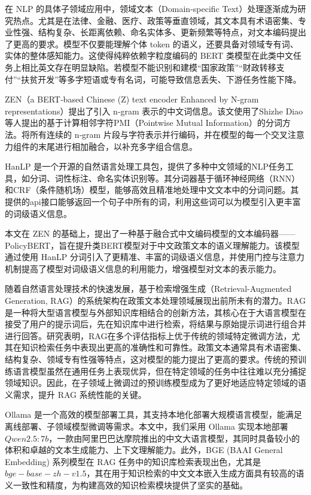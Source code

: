 \documentclass[12pt, a4paper]{ctexart}
\begin{document}
在 NLP 的具体子领域应用中，领域文本（Domain-specific Text）处理逐渐成为研究热点。尤其是在法律、金融、医疗、政策等垂直领域，其文本具有术语密集、专业性强、结构复杂、长距离依赖、命名实体多、更新频繁等特点，对文本编码提出了更高的要求。模型不仅要能理解个体 token 的语义，还要具备对领域专有词、实体的整体感知能力。这使得纯粹依赖字粒度编码的 BERT 类模型在此类中文任务上相比英文存在明显缺陷。若模型不能识别和建模“国家政策”“财政转移支付”“扶贫开发”等多字短语或专有名词，可能导致信息丢失、下游任务性能下降。

ZEN（a BERT‑based Chinese (Z) text encoder Enhanced by N‑gram representations）提出了引入 n‑gram 表示的中文词信息\cite{diao-etal-2020-zen}。该文使用了Shizhe Diao 等人提出的基于计算相邻字符PMI（Pointwise Mutual Information）的分词方法\cite{DXSJSZ2021}。将所有连续的 n‑gram 片段与字符表示并行编码，并在模型的每一个交叉注意力组件的末尾进行相加融合，以补充多字组合信息。

HanLP 是一个开源的自然语言处理工具包，提供了多种中文领域的NLP任务工具，如分词、词性标注、命名实体识别等\cite{he-choi-2021-stem}。其分词器基于循环神经网络（RNN）和CRF（条件随机场）模型，能够高效且精准地处理中文文本中的分词问题。其提供的api接口能够返回一个句子中所有的词，利用这些词可以为模型引入更丰富的词级语义信息。

本文在 ZEN 的基础上，提出了一种基于融合式中文编码模型的文本编码器——PolicyBERT，旨在提升类BERT模型对于中文政策文本的语义理解能力。该模型通过使用 HanLP 分词引入了更精准、丰富的词级语义信息，并使用门控与注意力机制提高了模型对词级语义信息的利用能力，增强模型对文本的表示能力。

\vspace{2em} %

随着自然语言处理技术的快速发展，基于检索增强生成（Retrieval-Augmented Generation, RAG）的系统架构在政策文本处理领域展现出前所未有的潜力。RAG是一种将大型语言模型与外部知识库相结合的创新方法，其核心在于大语言模型在接受了用户的提示词后，先在知识库中进行检索，将结果与原始提示词进行组合并进行回答。研究表明，RAG在多个评估指标上优于传统的领域特定微调方法，尤其在知识检索任务中表现出更高的准确性和可靠性\cite{lakatos2024investigatingperformanceretrievalaugmentedgeneration}。政策文本通常具有术语密集、结构复杂、领域专有性强等特点，这对模型的能力提出了更高的要求。传统的预训练语言模型虽然在通用任务上表现优异，但在特定领域的任务中往往难以充分捕捉领域知识。因此，在子领域上微调过的预训练模型成为了更好地适应特定领域的语义需求，提升 RAG 系统性能的关键。

Ollama 是一个高效的模型部署工具，其支持本地化部署大规模语言模型，能满足离线部署、子领域模型微调等需求。本文中，我们采用 Ollama 实现本地部署 $Qwen2.5:7b$，一款由阿里巴巴达摩院推出的中文大语言模型，其同时具备较小的体积和卓越的文本生成能力、上下文理解能力\cite{qwen2.5}。此外，BGE (BAAI General Embedding) 系列模型在 RAG 任务中的知识库检索表现出色，尤其是 $ bge-base-zh-v1.5 $，其在用于知识检索的中文文本嵌入生成方面具有较高的语义一致性和精度，为构建高效的知识检索模块提供了坚实的基础\cite{bgeembedding}。
\end{document}
